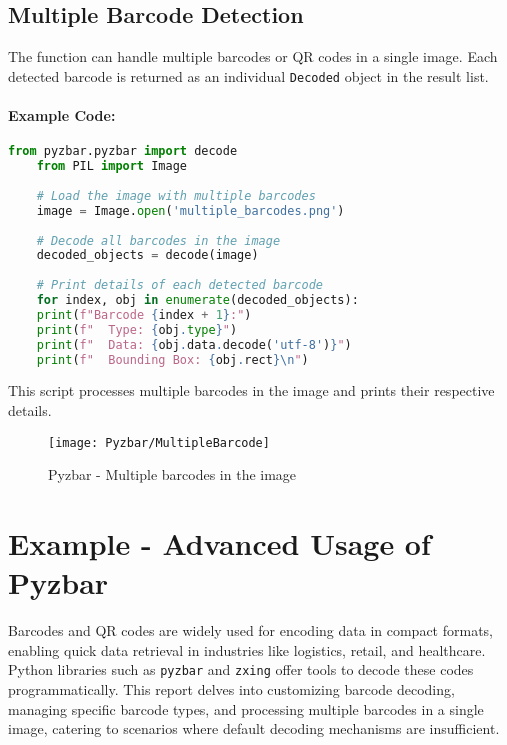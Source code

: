 \subsection{Multiple Barcode Detection}

The  function can handle multiple barcodes or QR codes in a single image. Each detected barcode is returned as an individual \texttt{Decoded} object in the result list.

\paragraph{Example Code:}
\begin{lstlisting}[language=Python]
	from pyzbar.pyzbar import decode
	from PIL import Image
	
	# Load the image with multiple barcodes
	image = Image.open('multiple_barcodes.png')
	
	# Decode all barcodes in the image
	decoded_objects = decode(image)
	
	# Print details of each detected barcode
	for index, obj in enumerate(decoded_objects):
	print(f"Barcode {index + 1}:")
	print(f"  Type: {obj.type}")
	print(f"  Data: {obj.data.decode('utf-8')}")
	print(f"  Bounding Box: {obj.rect}\n")
\end{lstlisting}

This script processes multiple barcodes in the image and prints their respective details.

\begin{figure}[h]
	\centering
	\texttt{[image: Pyzbar/MultipleBarcode]}
	\caption{Pyzbar - Multiple barcodes in the image}\label{Multiple Barcode}
\end{figure}

\section{Example - Advanced Usage of Pyzbar}

Barcodes and QR codes are widely used for encoding data in compact formats, enabling quick data retrieval in industries like logistics, retail, and healthcare. Python libraries such as \texttt{pyzbar} and \texttt{zxing} offer tools to decode these codes programmatically. This report delves into customizing barcode decoding, managing specific barcode types, and processing multiple barcodes in a single image, catering to scenarios where default decoding mechanisms are insufficient.\cite{pyzbargithub:2024}\\

